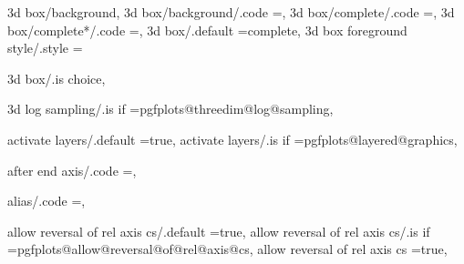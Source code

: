 3d box/background,%
3d box/background/.code                                            ={\def\pgfplots@threedimbox@choice{0}},%
3d box/complete/.code                                              ={\def\pgfplots@threedimbox@choice{1}},%
3d box/complete*/.code                                             ={\def\pgfplots@threedimbox@choice{2}},%
3d box/.default                                                    =complete,%
3d box foreground style/.style                                     ={%
3d box/.is choice,

3d log sampling/.is if                                             =pgfplots@threedim@log@sampling,                                                                                                    

activate layers/.default                                           =true,                                                                                                                              
activate layers/.is if                                             =pgfplots@layered@graphics,                                                                                                         

after end axis/.code                                               =,                                                                                                                                  

alias/.code                                                        ={},                                                   

allow reversal of rel axis cs/.default                             =true,%
allow reversal of rel axis cs/.is if                               =pgfplots@allow@reversal@of@rel@axis@cs,%
allow reversal of rel axis cs                                      =true,%

}
